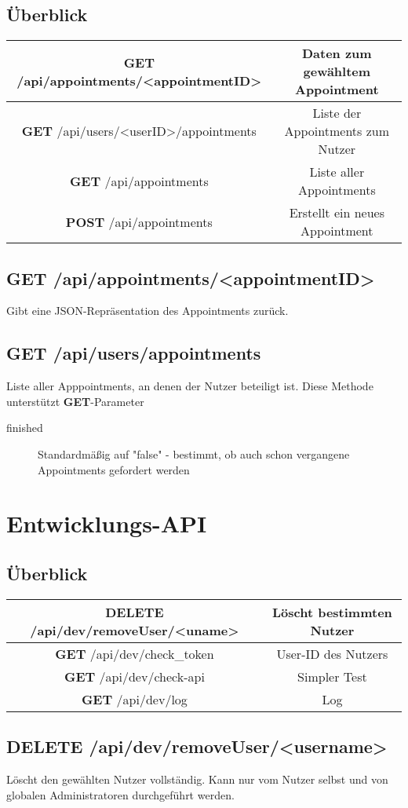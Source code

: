 \documentclass[11pt,a4paper]{article}
\begin{document}
\subsection{Überblick}
\begin{tabular}{|c|c|}
\hline
\textbf{GET} /api/appointments/<appointmentID> & Daten zum gewähltem Appointment \\
\hline
\textbf{GET} /api/users/<userID>/appointments & Liste der Appointments zum Nutzer \\
\hline
\textbf{GET} /api/appointments & Liste aller Appointments \\
\hline
\textbf{POST} /api/appointments & Erstellt ein neues Appointment \\
\hline
\end{tabular}

\subsection{\textbf{GET} /api/appointments/<appointmentID>}
Gibt eine JSON-Repräsentation des Appointments zurück.
\subsection{\textbf{GET} /api/users/appointments}
Liste aller Apppointments, an denen der Nutzer beteiligt ist. Diese Methode unterstützt \textbf{GET}-Parameter
\begin{description}
    \item[finished] Standardmäßig auf "false" - bestimmt, ob auch schon vergangene Appointments gefordert werden
\end{description}
\section{Entwicklungs-API}
\subsection{Überblick}

\begin{tabular}{|c|c|}
\hline
\textbf{DELETE} /api/dev/removeUser/<uname> & Löscht bestimmten Nutzer \\
\hline
\textbf{GET} /api/dev/check\_token & User-ID des Nutzers \\
\hline
\textbf{GET} /api/dev/check-api & Simpler Test \\
\hline
\textbf{GET} /api/dev/log & Log \\
\hline
\end{tabular}

\subsection{\textbf{DELETE} /api/dev/removeUser/<username>}
Löscht den gewählten Nutzer vollständig. Kann nur vom Nutzer selbst und von globalen Administratoren durchgeführt werden.
\end{document}

